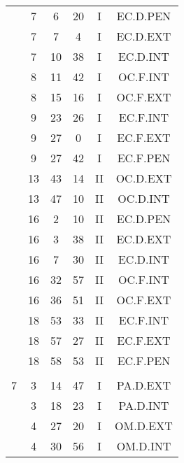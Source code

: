 \documentclass[12pt, a4paper]{article}
\begin{document}
\begin{multicols}{3}
{\begin{tabular}{c c c c c c}
	 	 	 	 & 7 & 6 & 20 & I & EC.D.PEN\\%
	 	 	 	 & 7 & 7 & 4 & I & EC.D.EXT\\%
	 	 	 	 & 7 & 10 & 38 & I & EC.D.INT\\%
	 	 	 	 & 8 & 11 & 42 & I & OC.F.INT\\%
	 	 	 	 & 8 & 15 & 16 & I & OC.F.EXT\\%
	 	 	 	 & 9 & 23 & 26 & I & EC.F.INT\\%
	 	 	 	 & 9 & 27 & 0 & I & EC.F.EXT\\%
	 	 	 	 & 9 & 27 & 42 & I & EC.F.PEN\\%
	 	 	 	 & 13 & 43 & 14 & II & OC.D.EXT\\%
	 	 	 	 & 13 & 47 & 10 & II & OC.D.INT\\%
	 	 	 	 & 16 & 2 & 10 & II & EC.D.PEN\\%
	 	 	 	 & 16 & 3 & 38 & II & EC.D.EXT\\%
	 	 	 	 & 16 & 7 & 30 & II & EC.D.INT\\%
	 	 	 	 & 16 & 32 & 57 & II & OC.F.INT\\%
	 	 	 	 & 16 & 36 & 51 & II & OC.F.EXT\\%
	 	 	 	 & 18 & 53 & 33 & II & EC.F.INT\\%
	 	 	 	 & 18 & 57 & 27 & II & EC.F.EXT\\%
	 	 	 	 & 18 & 58 & 53 & II & EC.F.PEN\\%
	 	 	 	 & & & & & \\%
	 	 	 	7 & 3 & 14 & 47 & I & PA.D.EXT\\%
	 	 	 	 & 3 & 18 & 23 & I & PA.D.INT\\%
	 	 	 	 & 4 & 27 & 20 & I & OM.D.EXT\\%
	 	 	 	 & 4 & 30 & 56 & I & OM.D.INT\\%

\end{tabular}}
\end{multicols}
\end{document}
